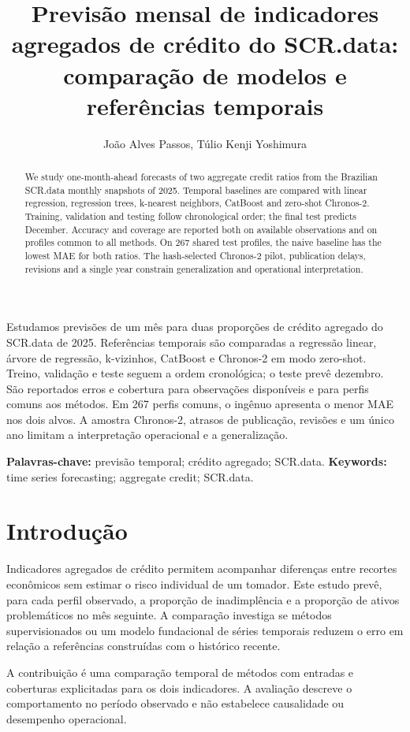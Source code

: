 \documentclass[12pt]{article}
\title{Previsão mensal de indicadores agregados de crédito do SCR.data: comparação de modelos e referências temporais}
\author{João Alves Passos, Túlio Kenji Yoshimura}
\begin{document}
\maketitle
\begin{abstract}
We study one-month-ahead forecasts of two aggregate credit ratios from the
Brazilian SCR.data monthly snapshots of 2025. Temporal baselines are compared
with linear regression, regression trees, k-nearest neighbors, CatBoost and
zero-shot Chronos-2. Training, validation and testing follow chronological
order; the final test predicts December. Accuracy and coverage are reported
both on available observations and on profiles common to all methods. On 267 shared test profiles, the naive baseline has the lowest MAE for both
ratios. The hash-selected Chronos-2 pilot, publication delays, revisions and
a single year constrain generalization and operational interpretation.
\end{abstract}
\begin{resumo}
Estudamos previsões de um mês para duas proporções de crédito agregado do
SCR.data de 2025. Referências temporais são comparadas a regressão linear,
árvore de regressão, k-vizinhos, CatBoost e Chronos-2 em modo zero-shot.
Treino, validação e teste seguem a ordem cronológica; o teste prevê dezembro.
São reportados erros e cobertura para observações disponíveis e para perfis
comuns aos métodos. Em 267 perfis comuns, o ingênuo apresenta o menor MAE
nos dois alvos. A amostra Chronos-2, atrasos de publicação, revisões e um
único ano limitam a interpretação operacional e a generalização.
\end{resumo}
\noindent\textbf{Palavras-chave:} previsão temporal; crédito agregado; SCR.data.
\newline\textbf{Keywords:} time series forecasting; aggregate credit; SCR.data.

\section{Introdução}
Indicadores agregados de crédito permitem acompanhar diferenças entre recortes
econômicos sem estimar o risco individual de um tomador. Este estudo prevê,
para cada perfil observado, a proporção de inadimplência e a proporção de
ativos problemáticos no mês seguinte. A comparação investiga se métodos
supervisionados ou um modelo fundacional de séries temporais reduzem o erro
em relação a referências construídas com o histórico recente.

A contribuição é uma comparação temporal de métodos com entradas e coberturas
explicitadas para os dois indicadores. A avaliação descreve o comportamento
no período observado e não estabelece causalidade ou desempenho operacional.
\end{document}
